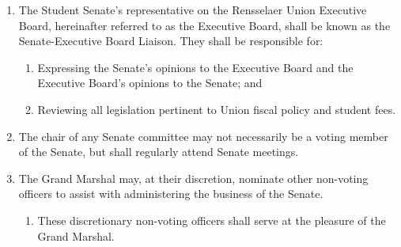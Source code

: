\begin{enumerate}
  \begin{enumerate}
  \item Advising the presiding officer on matters of parliamentary procedure;
  \item Maintaining an orderly meeting, abiding by rules of decorum; and
  \item Maintaining an accurate record of all legislation brought before the Senate.
  \end{enumerate}
\item The Student Senate’s representative on the Rensselaer Union Executive Board, hereinafter referred to as the Executive Board, shall be known as the Senate-Executive Board Liaison. They shall be responsible for:
  \begin{enumerate}
  \item Expressing the Senate’s opinions to the Executive Board and the Executive Board’s opinions to the Senate; and
  \item Reviewing all legislation pertinent to Union fiscal policy and student fees.
  \end{enumerate}
\item The chair of any Senate committee may not necessarily be a voting member of the Senate, but shall regularly attend Senate meetings.
\item The Grand Marshal may, at their discretion, nominate other non-voting officers to assist with administering the business of the Senate.
  \begin{enumerate}
  \item These discretionary non-voting officers shall serve at the pleasure of the Grand Marshal.
  \end{enumerate}
\end{enumerate}


